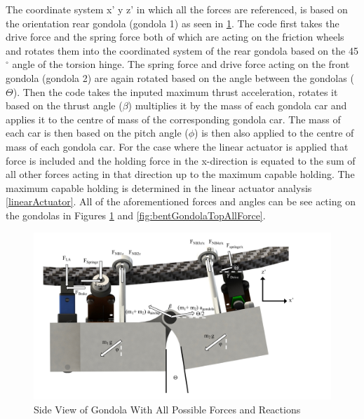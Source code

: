 \documentclass[../main.tex]{subfiles}
\begin{document}
The coordinate system x' y z' in which all the forces are referenced, is based on the orientation rear gondola (gondola 1) as seen in \ref{fig:bentGondolaSideAllForce}. The code first takes the drive force and the spring force both of which are acting on the friction wheels and rotates them into the coordinated system of the rear gondola based on the 45$^{\circ}$ angle of the torsion hinge. The spring force and drive force acting on the front gondola (gondola 2) are again rotated based on the angle between the gondolas ($\Theta$). Then the code takes the inputed maximum thrust acceleration, rotates it based on the thrust angle ($\beta$) multiplies it by the mass of each gondola car and applies it to the centre of mass of the corresponding gondola car. The mass of each car is then based on the pitch angle ($\phi$) is then also applied to the centre of mass of each gondola car. For the case where the linear actuator is applied that force is included and the holding force in the x-direction is equated to the sum of all other forces acting in that direction up to the maximum capable holding. The maximum capable holding is determined in the linear actuator analysis \ref{linearActuator}. All of the aforementioned forces and angles can be see acting on the gondolas in Figures \ref{fig:bentGondolaSideAllForce} and \ref{fig:bentGondolaTopAllForce}. \\
\begin{figure}[H]
	\centering
	\includegraphics[width=1.1\linewidth]{img/gondola/bentGondolaSideAllForces.pdf}
	\caption{Side View of Gondola With All Possible Forces and Reactions}
	\label{fig:bentGondolaSideAllForce}
\end{figure}
\end{document}
